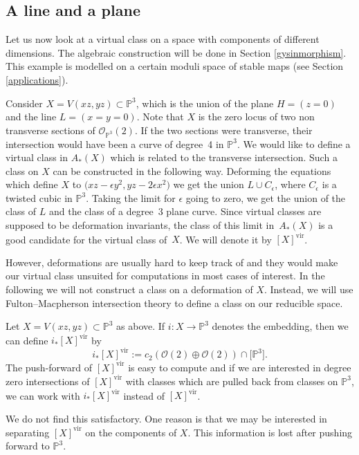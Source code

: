 \documentclass[pdftex]{sigma}
\numberwithin{equation}{section}
\newcommand{\vv}{\mathrm{vir}}
\newcommand{\OO}{\mathcal{O}}
\newcommand{\PP}{\mathbb P}
\begin{document}
\subsection{A line and a plane}
Let us now look at a virtual class on a space with components of different dimensions. The algebraic construction will be done in Section \ref{gysinmorphism}. This example is modelled on a certain moduli space of stable maps (see Section \ref{applications}).

Consider $X=V(xz,yz)\subset\PP^3$, which is the union of the plane $H=(z=0)$ and the line $L=(x=y=0)$. Note that $X$ is the zero locus of two non transverse sections of $\OO_{\PP^3}(2)$. If the two sections were transverse, their intersection would have been a curve of degree~4 in $\PP^3$. We would like to define a virtual class in $A_*(X)$ which is related to the transverse intersection. Such a class on $X$ can be constructed in the following way. Deforming the equations which define $X$ to $\big(xz-\epsilon y^2,yz-2\epsilon x^2\big)$ we get the union $L\cup C_{\epsilon}$, where $C_{\epsilon}$ is a twisted cubic in $\mathbb P^3$. Taking the limit for $\epsilon$ going to zero, we get the union of the class of $L$ and the class of a degree~3 plane curve. Since virtual classes are supposed to be deformation invariants, the class of this limit in~$A_*(X)$ is a good candidate for the virtual class of~$X$. We will denote it by $[X]^{\vv}$.

However, deformations are usually hard to keep track of and they would make our virtual class unsuited for computations in most cases of interest. In the following we will not construct a class on a deformation of $X$. Instead, we will use Fulton--Macpherson intersection theory to define a class on our reducible space.

\begin{Remark} Let $X=V(xz,yz)\subset\PP^3$ as above. If $i:X\to\PP^3$ denotes the embedding, then we can define $i_*[X]^{\vv}$ by
\[
i_*[X]^{\vv}:=c_2(\mathcal{O}(2)\oplus \mathcal{O}(2))\cap\big[\PP^3\big].
\]
The push-forward of $[X]^{\vv}$ is easy to compute and if we are interested in degree zero intersections of $[X]^{\vv}$ with classes which are pulled back from classes on $\PP^3$, we can work with $i_*[X]^{\vv}$ instead of $[X]^{\vv}$.

We do not find this satisfactory. One reason is that we may be interested in separating $[X]^{\vv}$ on the components of $X$. This information is lost after pushing forward to $\PP^3$.
\end{Remark}
\end{document}
